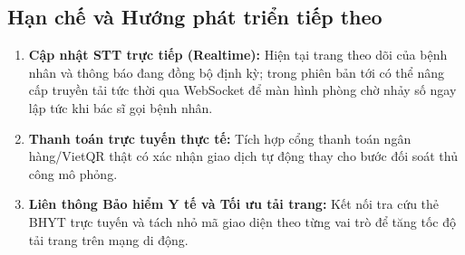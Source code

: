 \documentclass[12pt,a4paper]{report}
\begin{document}
\subsection{Hạn chế và Hướng phát triển tiếp theo}
\begin{enumerate}
  \item \textbf{Cập nhật STT trực tiếp (Realtime):} Hiện tại trang theo dõi của bệnh nhân và thông báo đang đồng bộ định kỳ; trong phiên bản tới có thể nâng cấp truyền tải tức thời qua WebSocket để màn hình phòng chờ nhảy số ngay lập tức khi bác sĩ gọi bệnh nhân.
  \item \textbf{Thanh toán trực tuyến thực tế:} Tích hợp cổng thanh toán ngân hàng/VietQR thật có xác nhận giao dịch tự động thay cho bước đối soát thủ công mô phỏng.
  \item \textbf{Liên thông Bảo hiểm Y tế và Tối ưu tải trang:} Kết nối tra cứu thẻ BHYT trực tuyến và tách nhỏ mã giao diện theo từng vai trò để tăng tốc độ tải trang trên mạng di động.
\end{enumerate}
\end{document}

